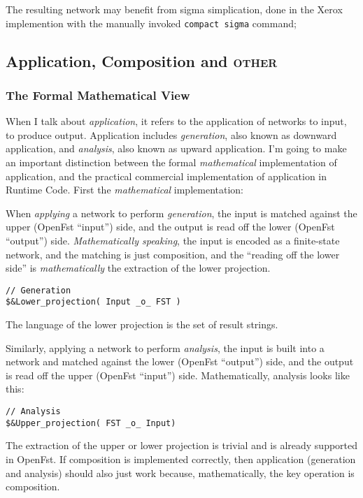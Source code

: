 \documentclass[letterpaper,11pt]{article}
\providecommand{\acro}{}\renewcommand{\acro}{\textsc}
\begin{document}
The resulting network may benefit from sigma simplication, done in the Xerox implemention with the
manually invoked \texttt{compact~sigma} command;


\subsection{Application, Composition and \acro{other}}

\subsubsection{The Formal Mathematical View}

When I talk about \emph{application}, it refers to the application of networks to input, to
produce output.  Application includes \emph{generation}, also known as downward application,
and \emph{analysis}, also known as upward application.
I'm going to make an important distinction between the formal \emph{mathematical} implementation of
application, and the practical commercial implementation of application in Runtime Code.
First the \emph{mathematical} implementation:

When \emph{applying} a network to perform \emph{generation}, the input is 
matched against the upper (OpenFst
``input'') side, and the output is read off the lower (OpenFst
``output'') side.  \emph{Mathematically speaking}, the input is encoded as a finite-state
network, and the matching is
just composition, and the ``reading off the lower side'' is
\emph{mathematically} the extraction
of the lower projection.

\begin{Verbatim}[fontsize=\small]
// Generation
$&Lower_projection( Input _o_ FST )
\end{Verbatim}

\noindent
The language of the lower projection is the set of result strings.

Similarly, applying a network to perform \emph{analysis}, the input is built into a network
and matched against the lower (OpenFst
``output'') side, and the output is read off the upper (OpenFst ``input'') side.  Mathematically,
analysis looks like this:

\begin{Verbatim}[fontsize=\small]
// Analysis
$&Upper_projection( FST _o_ Input)
\end{Verbatim}

\noindent
The extraction of the upper or lower projection is trivial and is already supported in
OpenFst.
If composition is implemented correctly, then application (generation and analysis) should
also just work because, mathematically, the key operation is composition.
\end{document}
